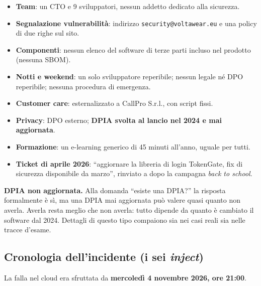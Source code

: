 \begin{itemize}
  \item \textbf{Team}: un CTO e 9 sviluppatori, nessun addetto dedicato alla sicurezza.
  \item \textbf{Segnalazione vulnerabilità}: indirizzo \texttt{security@voltawear.eu} e una policy di
    due righe sul sito.
  \item \textbf{Componenti}: nessun elenco del software di terze parti incluso nel prodotto (nessuna SBOM).
  \item \textbf{Notti e weekend}: un solo sviluppatore reperibile; nessun legale né DPO reperibile;
    nessuna procedura di emergenza.
  \item \textbf{Customer care}: esternalizzato a CallPro S.r.l., con script fissi.
  \item \textbf{Privacy}: DPO esterno; \textbf{DPIA svolta al lancio nel 2024 e mai aggiornata}.
  \item \textbf{Formazione}: un e-learning generico di 45 minuti all'anno, uguale per tutti.
  \item \textbf{Ticket di aprile 2026}: ``aggiornare la libreria di login TokenGate, fix di sicurezza
    disponibile da marzo'', rinviato a dopo la campagna \emph{back to school}.
\end{itemize}

\begin{esame}
\textbf{DPIA non aggiornata.} Alla domanda ``esiste una DPIA?'' la risposta formalmente è sì, ma una
DPIA mai aggiornata può valere quasi quanto non averla. Averla resta meglio che non averla: tutto
dipende da quanto è cambiato il software dal 2024. Dettagli di questo tipo compaiono sia nei casi
reali sia nelle tracce d'esame.
\end{esame}

\subsection{Cronologia dell'incidente (i sei \emph{inject})}

La falla nel cloud era sfruttata da \textbf{mercoledì 4 novembre 2026, ore 21:00}.

